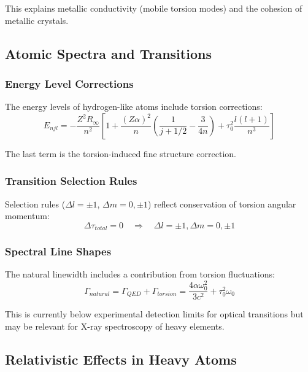 This explains metallic conductivity (mobile torsion modes) and the cohesion of metallic crystals.

\subsection{Atomic Spectra and Transitions}

\subsubsection{Energy Level Corrections}

The energy levels of hydrogen-like atoms include torsion corrections:
\begin{equation}
    E_{njl} = -\frac{Z^2 R_\infty}{n^2}\left[1 + \frac{(Z\alpha)^2}{n}\left(\frac{1}{j+1/2} - \frac{3}{4n}\right) + \tau_0^2 \frac{l(l+1)}{n^3}\right]
\end{equation}

The last term is the torsion-induced fine structure correction.

\subsubsection{Transition Selection Rules}

Selection rules ($\Delta l = \pm 1$, $\Delta m = 0, \pm 1$) reflect conservation of torsion angular momentum:
\begin{equation}
    \Delta \tau_{total} = 0 \quad \Rightarrow \quad \Delta l = \pm 1, \Delta m = 0, \pm 1
\end{equation}

\subsubsection{Spectral Line Shapes}

The natural linewidth includes a contribution from torsion fluctuations:
\begin{equation}
    \Gamma_{natural} = \Gamma_{QED} + \Gamma_{torsion} = \frac{4\alpha \omega_0^2}{3c^2} + \tau_0^2 \omega_0
\end{equation}

This is currently below experimental detection limits for optical transitions but may be relevant for X-ray spectroscopy of heavy elements.

\subsection{Relativistic Effects in Heavy Atoms}

